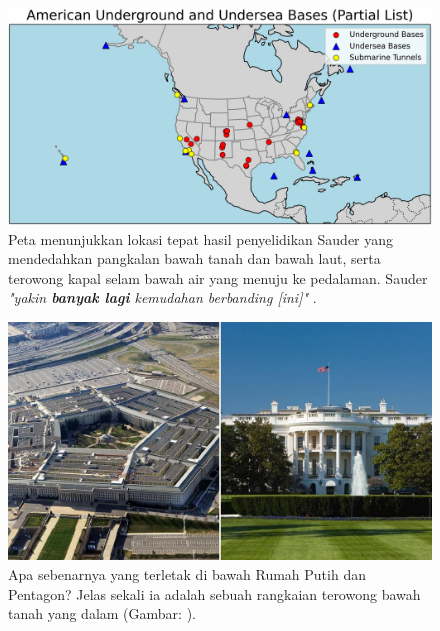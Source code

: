 \documentclass[10pt,twocolumn,letterpaper]{article}
\begin{document}
\begin{figure}[t]
\begin{center}
\includegraphics[width=1\textwidth]{basescrop.png}
\end{center}
   \caption{Peta menunjukkan lokasi tepat hasil penyelidikan Sauder yang mendedahkan pangkalan bawah tanah dan bawah laut, serta terowong kapal selam bawah air yang menuju ke pedalaman. Sauder \textit{"yakin \textbf{banyak lagi} kemudahan berbanding [ini]"} \cite{22}.}
   \label{fig:4}
\end{figure}

\begin{figure}[t]
\begin{center}
   \includegraphics[width=1\linewidth]{penta.jpg}
\end{center}
   \caption{Apa sebenarnya yang terletak di bawah Rumah Putih dan Pentagon? Jelas sekali ia adalah sebuah rangkaian terowong bawah tanah yang dalam (Gambar: \cite{31}).}
\label{fig:3}
\label{fig:onecol}
\end{figure}
\end{document}
